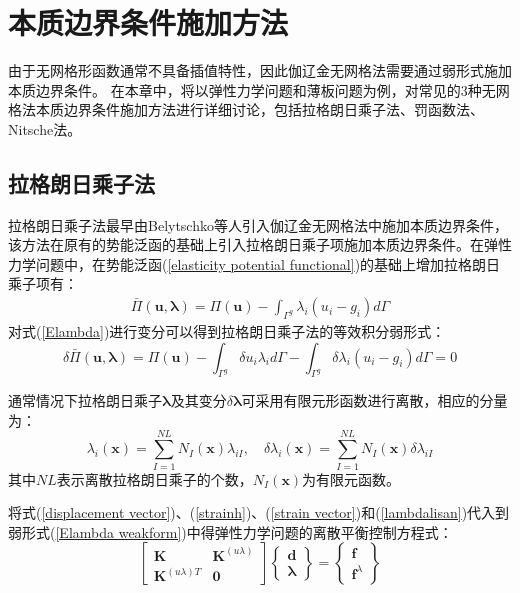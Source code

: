 \chapter{本质边界条件施加方法}
由于无网格形函数通常不具备插值特性，因此伽辽金无网格法需要通过弱形式施加本质边界条件。
在本章中，将以弹性力学问题和薄板问题为例，对常见的3种无网格法本质边界条件施加方法进行详细讨论，包括拉格朗日乘子法、罚函数法、Nitsche法。
\section{拉格朗日乘子法}
拉格朗日乘子法最早由Belytschko等人\cite{belytschko1994}引入伽辽金无网格法中施加本质边界条件，该方法在原有的势能泛函的基础上引入拉格朗日乘子项施加本质边界条件。在弹性力学问题中，在势能泛函(\ref{elasticity potential functional})的基础上增加拉格朗日乘子项有：
\begin{equation}\label{Elambda}
\begin{split}
    \bar{\Pi}(\pmb{u},\pmb \lambda)=\Pi(\pmb{u})-\int_{\Gamma^g}\lambda_i(u_i-g_i)d\Gamma
\end{split}
\end{equation}   
对式(\ref{Elambda})进行变分可以得到拉格朗日乘子法的等效积分弱形式：
\begin{equation}\label{Elambda weakform}
        \delta\bar{\Pi}(\pmb{u},\pmb{\lambda})=\Pi(\pmb{u})-\int_{\Gamma^g}\delta u_i\lambda_id\Gamma-\int_{\Gamma^g}\delta\lambda_i(u_i-g_i)d\Gamma=0
\end{equation}\par
通常情况下拉格朗日乘子$\pmb{\lambda}$及其变分$\delta\pmb{\lambda}$可采用有限元形函数进行离散，相应的分量为：
\begin{equation}\label{lambdalisan}
\lambda_i(\pmb{x})=\sum_{I=1}^{N\!L}N_I(\pmb{x})\lambda_{iI},\quad
\delta\lambda_i(\pmb{x})=\sum_{I=1}^{N\!L}N_I(\pmb{x})\delta\lambda_{iI}
\end{equation}
其中$N\!L$表示离散拉格朗日乘子的个数，$N_I(\pmb{x})$为有限元函数。\par
将式(\ref{displacement vector})、(\ref{strainh})、(\ref{strain vector})和(\ref{lambdalisan})代入到弱形式(\ref{Elambda weakform})中得弹性力学问题的离散平衡控制方程式：
\begin{equation}
    \begin{bmatrix}\pmb{K}&\pmb{K}^{(u\lambda)}\\\pmb{K}^{(u\lambda) T}&\pmb{0}\end{bmatrix}
    \left\{\begin{matrix}\pmb{d}\\\pmb{\lambda}\end{matrix}\right\}=
    \left\{\begin{matrix}\pmb{f}\\\pmb{f}^{\lambda}\end{matrix}\right\}
\end{equation}
